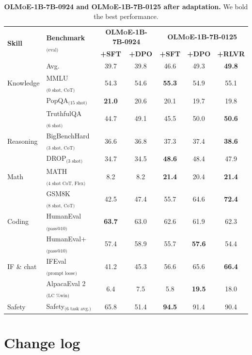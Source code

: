 \documentclass{article}
\newcommand{\modelsmallnew}{\textbf{\textsc{OLMoE-1B-7B-0125}}}
\newcommand{\modelsmalldate}{\textbf{\textsc{OLMoE-1B-7B-0924}}}
\begin{document}
\begin{table}[htbp]
\centering
\begin{tabular}{ll|cc|ccc}
\toprule
\multirow{2}{*}{\textbf{Skill}} & \multirow{2}{*}{\textbf{Benchmark}$_\text{(eval)}$} & \multicolumn{2}{c|}{\modelsmalldate} & \multicolumn{3}{c}{\modelsmallnew{}} \\[0.1em]
&&\textbf{+SFT} & \textbf{+DPO} & \textbf{+SFT} & \textbf{+DPO} & \textbf{+RLVR} \\
\midrule
& Avg. & 39.7 & 39.8 & 46.6 & 49.3 & \textbf{49.8} \\
\midrule
Knowledge & MMLU$_\text{(0 shot, CoT)}$ & 54.3 & 54.6 & \textbf{55.3} & 54.9 & 55.1 \\
& PopQA$_\text{(15 shot)}$ & \textbf{21.0} & 20.6 & 20.1 & 19.7 & 19.8 \\
& TruthfulQA$_\text{(6 shot)}$ & 44.7 & 49.1 & 45.5 & 50.0 & \textbf{50.6} \\
\midrule
Reasoning & BigBenchHard$_\text{(3 shot, CoT)}$ & 36.6 & 36.8 & 37.3 & 37.4 & \textbf{38.6} \\
& DROP$_\text{(3 shot)}$ & 34.7 & 34.5 & \textbf{48.6} & 48.4 & 47.9 \\
\midrule
Math & MATH$_\text{(4 shot CoT, Flex)}$ & 8.2 & 8.2 & \textbf{21.4} & 20.4 & \textbf{21.4} \\
& GSM8K$_\text{(8 shot, CoT)}$ & 42.5 & 47.4 & 55.7 & 64.6 & \textbf{72.4} \\
\midrule
Coding & HumanEval$_\text{(pass@10)}$ & \textbf{63.7} & 63.0 & 62.6 & 61.9 & 62.3 \\
& HumanEval+$_\text{(pass@10)}$ & 57.4 & 58.9 & 55.7 & \textbf{57.6} & 54.4 \\
\midrule
IF \& chat & IFEval$_\text{(prompt loose)}$ & 41.2 & 45.3 & 56.6 & 65.6 & \textbf{66.4} \\
& AlpacaEval 2$_\text{(LC \% win)}$ & 6.4 & 7.5 & 5.8 & \textbf{19.5} & 18.0 \\
\midrule
Safety & Safety$_\text{(6 task avg.)}$ & 65.8 & 51.4 & \textbf{94.5} & 91.4 & 90.4 \\
\bottomrule
\end{tabular}
\vspace{.5em}
\caption{\textbf{\modelsmalldate{} and \modelsmallnew{} after adaptation.} We bold the best performance.}
\label{tab:adaptresultsnew}
\end{table}

\FloatBarrier

\section{Change log}
\label{sec:log}
\end{document}
